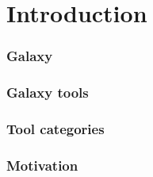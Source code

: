 \chapter{Introduction}\label{chap:introduction}
    \subsection{Galaxy}

    \subsection{Galaxy tools}

    \subsection{Tool categories}

    \subsection{Motivation}
